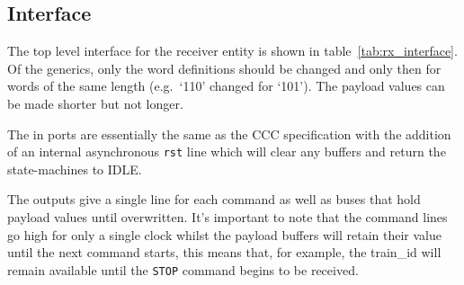 \subsection{Interface} %
\label{sub:rx_interface}
The top level interface for the receiver entity is shown in table~\ref{tab:rx_interface}. Of the generics, only the word definitions should be changed and only then for words of the same length (e.g.\ `110' changed for `101'). The payload values can be made shorter but not longer.
    
The in ports are essentially the same as the CCC specification with the addition of an internal asynchronous \texttt{rst} line which will clear any buffers and return the state-machines to IDLE.
    
The outputs give a single line for each command as well as buses that hold payload values until overwritten. It's important to note that the command lines go high for only a single clock whilst the payload buffers will retain their value until the next command starts, this means that, for example, the train\_id will remain available until the \texttt{STOP} command begins to be received.
